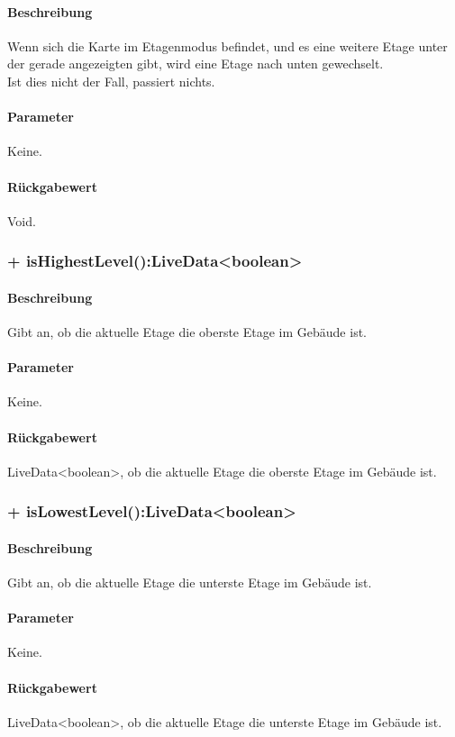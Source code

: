 \paragraph*{Beschreibung}
Wenn sich die Karte im Etagenmodus befindet, und es eine weitere Etage unter der gerade 
angezeigten gibt, wird eine Etage nach unten gewechselt.\\
Ist dies nicht der Fall, passiert nichts.
\paragraph*{Parameter}
Keine.
\paragraph*{Rückgabewert}
Void.

\subsubsection{+ isHighestLevel():LiveData<boolean>}%
\paragraph*{Beschreibung}
Gibt an, ob die aktuelle Etage die oberste Etage im Gebäude ist.
\paragraph*{Parameter}
Keine.
\paragraph*{Rückgabewert}
LiveData<boolean>, ob die aktuelle Etage die oberste Etage im Gebäude ist.

\subsubsection{+ isLowestLevel():LiveData<boolean>}%
\paragraph*{Beschreibung}
Gibt an, ob die aktuelle Etage die unterste Etage im Gebäude ist.
\paragraph*{Parameter}
Keine.
\paragraph*{Rückgabewert}
LiveData<boolean>, ob die aktuelle Etage die unterste Etage im Gebäude ist.

